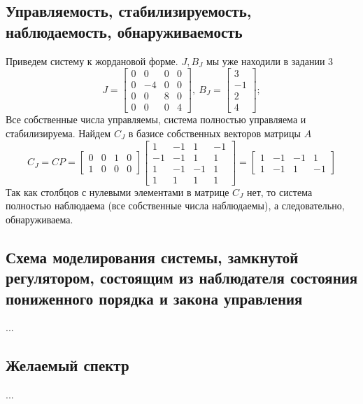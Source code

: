 \documentclass[a4paper, 12pt]{article}
\begin{document}
    \subsection{Управляемость, стабилизируемость, наблюдаемость, обнаруживаемость}
    Приведем систему к жордановой форме. $J,B_J$ мы уже находили в задании 3
    $$
    J=\begin{bmatrix}
        0     &0     &0     &0\\
        0    &-4     &0     &0\\
        0     &0     &8     &0\\
        0     &0     &0     &4
        \end{bmatrix},\ B_J=\begin{bmatrix}
            3\\
            -1\\
             2\\
             4
        \end{bmatrix};
    $$
    Все собственные числа управляемы, система полностью управляема и стабилизируема. Найдем $C_J$ в базисе собственных векторов матрицы $A$
    $$
        C_J=CP=\begin{bmatrix}
            0 &0 &1 &0\\
            1 &0 &0 &0
        \end{bmatrix}\begin{bmatrix}
            1    &-1     &1    &-1\\
            -1    &-1     &1     &1\\
             1    &-1    &-1     &1\\
             1     &1     &1     &1
            \end{bmatrix}=\begin{bmatrix}
                1    &-1    &-1     &1\\
     1    &-1     &1    &-1
            \end{bmatrix}
    $$
    Так как столбцов с нулевыми элементами в матрице $C_J$ нет, то система полностью наблюдаема (все собственные числа наблюдаемы),
    а следовательно, обнаруживаема.


    \subsection{Схема моделирования системы, замкнутой регулятором, состоящим из наблюдателя состояния пониженного порядка и закона управления}
    ...


    \subsection{Желаемый спектр}
    ...
\end{document}
